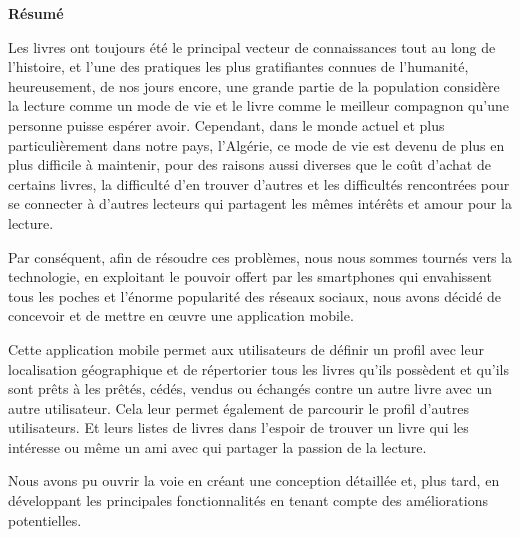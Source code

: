 
\newpage

\thispagestyle{empty}

\vspace*{2cm}

\begin{center}
\textbf{Résumé}
\end{center}

Les livres ont toujours été le principal vecteur de connaissances tout au long de l'histoire, et l'une des pratiques les plus gratifiantes connues de l'humanité, heureusement, de nos jours encore, une grande partie de la population considère la lecture comme un mode de vie et le livre comme le meilleur compagnon qu'une personne puisse espérer avoir. Cependant, dans le monde actuel et plus particulièrement dans notre pays, l'Algérie, ce mode de vie est devenu de plus en plus difficile à maintenir, pour des raisons aussi diverses que le coût d'achat de certains livres, la difficulté d'en trouver d'autres et les difficultés rencontrées pour se connecter à d'autres lecteurs qui partagent les mêmes intérêts et amour pour la lecture.\medskip

Par conséquent, afin de résoudre ces problèmes, nous nous sommes tournés vers la technologie, en exploitant le pouvoir offert par les smartphones qui envahissent tous les poches et l’énorme popularité des réseaux sociaux, nous avons décidé de concevoir et de mettre en œuvre une application mobile.\medskip

Cette application mobile permet aux utilisateurs de définir un profil avec leur localisation géographique et de répertorier tous les livres qu'ils possèdent et qu’ils sont prêts à les prêtés, cédés, vendus ou échangés contre un autre livre avec un autre utilisateur. Cela leur permet également de parcourir le profil d'autres utilisateurs. Et leurs listes de livres dans l’espoir de trouver un livre qui les intéresse ou même un ami avec qui partager la passion de la lecture.\medskip

Nous avons pu ouvrir la voie en créant une conception détaillée et, plus tard, en développant les principales fonctionnalités en tenant compte des améliorations potentielles.